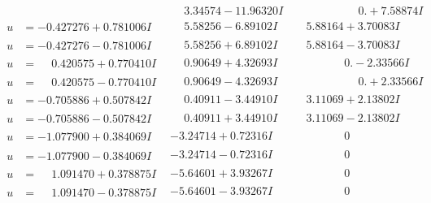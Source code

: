 \documentclass[1p]{elsarticle_modified}
\theoremstyle{definition}
\begin{document}
$$\begin{array}{c|c|c}
 & \phantom{-}3.34574 - 11.96320 I & \phantom{-0.000000 -}0. + 7.58874 I \\ \hline\begin{aligned}
u &= -0.427276 + 0.781006 I\end{aligned}
 & \phantom{-}5.58256 - 6.89102 I & \phantom{-}5.88164 + 3.70083 I \\ \hline\begin{aligned}
u &= -0.427276 - 0.781006 I\end{aligned}
 & \phantom{-}5.58256 + 6.89102 I & \phantom{-}5.88164 - 3.70083 I \\ \hline\begin{aligned}
u &= \phantom{-}0.420575 + 0.770410 I\end{aligned}
 & \phantom{-}0.90649 + 4.32693 I & \phantom{-0.000000 } 0. - 2.33566 I \\ \hline\begin{aligned}
u &= \phantom{-}0.420575 - 0.770410 I\end{aligned}
 & \phantom{-}0.90649 - 4.32693 I & \phantom{-0.000000 -}0. + 2.33566 I \\ \hline\begin{aligned}
u &= -0.705886 + 0.507842 I\end{aligned}
 & \phantom{-}0.40911 - 3.44910 I & \phantom{-}3.11069 + 2.13802 I \\ \hline\begin{aligned}
u &= -0.705886 - 0.507842 I\end{aligned}
 & \phantom{-}0.40911 + 3.44910 I & \phantom{-}3.11069 - 2.13802 I \\ \hline\begin{aligned}
u &= -1.077900 + 0.384069 I\end{aligned}
 & -3.24714 + 0.72316 I & \phantom{-0.000000 } 0 \\ \hline\begin{aligned}
u &= -1.077900 - 0.384069 I\end{aligned}
 & -3.24714 - 0.72316 I & \phantom{-0.000000 } 0 \\ \hline\begin{aligned}
u &= \phantom{-}1.091470 + 0.378875 I\end{aligned}
 & -5.64601 + 3.93267 I & \phantom{-0.000000 } 0 \\ \hline\begin{aligned}
u &= \phantom{-}1.091470 - 0.378875 I\end{aligned}
 & -5.64601 - 3.93267 I & \phantom{-0.000000 } 0 \\ \hline\begin{aligned}

\end{aligned}
\end{array}$$
\end{document}
